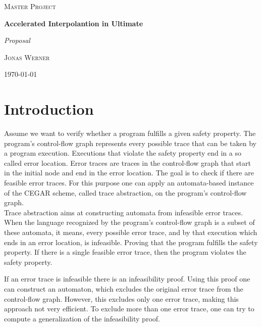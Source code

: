 \documentclass{article}
\begin{document}
	\newcommand{\HorizontalLine}{\rule{\linewidth}{0.3mm}}
	
		\begin{center}
		{\scshape\Large Master Project \par}
		\vspace{1.5cm}
		{\huge\bfseries Accelerated Interpolantion in Ultimate \par}
		{\Huge\itshape Proposal \par}
		\vspace{1cm}
		{\large \scshape Jonas Werner\par}
		\vspace{0.5cm}
		{\today \vspace{2cm}} 
		
		\end{center}

\section{Introduction}
Assume we want to verify whether a program fulfills a given safety property. The program's control-flow graph represents every possible trace that can be taken by a program execution. Executions that violate the safety property end in a so called error location. Error traces are traces in the control-flow graph that start in the initial node and end in the error location. The goal is to check if there are feasible error traces.
For this purpose one can apply an automata-based instance of the CEGAR scheme, called trace abstraction, on the program's control-flow graph. \\

Trace abstraction aims at constructing automata \cite{10.1007/978-3-642-39799-8_2} from infeasible error traces. When the language recognized by the program's control-flow graph is a subset of these automata, it means, every possible error trace, and by that execution which ends in an error location, is infeasible. Proving that the program fulfills the safety property. If there is a single feasible error trace, then the program violates the safety property.\\
\par 
If an error trace is infeasible there is an infeasibility proof. Using this proof one can construct an automaton, which excludes the original error trace from the control-flow graph. However, this excludes only one error trace, making this approach not very efficient. To exclude more than one error trace, one can try to compute a generalization of the infeasibility proof. \par
\end{document}
